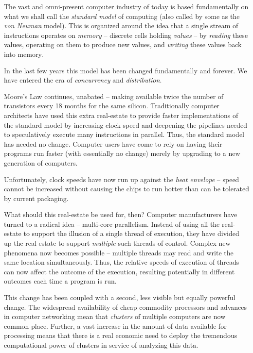 The vast and omni-present computer industry of today is based
fundamentally on what we shall call the {\em standard model} of
computing (also  called by some as the {\em von Neuman} model). This
is organized around the idea that a single stream of instructions
operates on  {\em memory} -- discrete cells holding {\em values}  --
by {\em reading}  these values, operating on them to produce new
values, and {\em writing} these values back into memory.

In the last few years this model has been changed fundamentally and
forever. We have entered the era of {\em concurrency} and {\em
  distribution}. 

Moore's Law continues, unabated -- making available twice the number
of transistors every 18 months for the same silicon. Traditionally
computer  architects have used this extra real-estate to provide
faster implementations of the standard model by increasing clock-speed
and  deepening the pipelines needed to speculatively execute many
instructions in parallel. Thus, the standard model has needed no
change.  Computer users have come to rely on having their programs run
faster (with essentially no change) merely by upgrading to a new
generation of computers.

Unfortunately, clock speeds have now run up against the {\em heat
  envelope} -- speed cannot be increased without causing the chips to
run hotter  than can be tolerated by current packaging. 

What should this real-estate be used for, then? Computer manufacturers
have turned to a radical idea -- multi-core parallelism. Instead of
using all the real-estate to support the illusion of a single thread
of execution, they have divided up the real-estate to support {\em
  multiple} such threads of control. Complex new phenomena now becomes
possible -- multiple threads may read and write the same location
simultaneously. Thus, the relative speeds of execution of threads can
now affect  the outcome of the execution, resulting potentially in
different outcomes each time a program is run.  

This change has been coupled with a second, less visible but equally
powerful change. The widespread availability of cheap commodity
processors  and advances in computer networking mean that {\em
  clusters} of multiple computers are now common-place. Further, a
vast increase in the amount of data available for processing means
that there is a real economic need to deploy the tremendous
computational power of clusters in service of analyzing this data.

